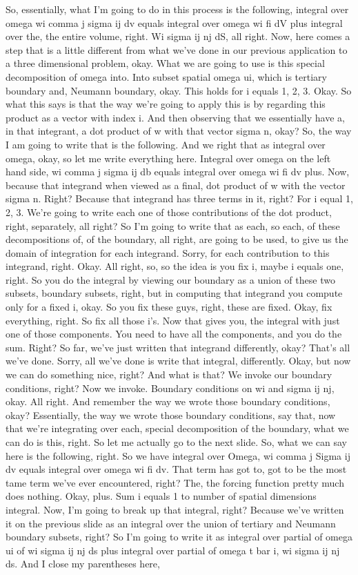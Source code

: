 \documentclass[10pt]{article}
\begin{document}
So, essentially, what I'm going to do in this process is the following, integral over omega wi comma j sigma ij dv equals integral over omega wi fi dV plus integral over the, the entire volume, right. Wi sigma ij nj dS, all right. Now, here comes a step that is a little different from what we've done in our previous application to a three dimensional problem, okay. What we are going to use is this special decomposition of omega into. Into subset spatial omega ui, which is tertiary boundary and, Neumann boundary, okay. This holds for i equals 1, 2, 3. Okay. So what this says is that the way we're going to apply this is by regarding this product as a vector with index i. And then observing that we essentially have a, in that integrant, a dot product of w with that vector sigma n, okay? So, the way I am going to write that is the following. And we right that as integral over omega, okay, so let me write everything here. Integral over omega on the left hand side, wi comma j sigma ij db equals integral over omega wi fi dv plus. Now, because that integrand when viewed as a final, dot product of w with the vector sigma n. Right? Because that integrand has three terms in it, right? For i equal 1, 2, 3. We're going to write each one of those contributions of the dot product, right, separately, all right? So I'm going to write that as each, so each, of these decompositions of, of the boundary, all right, are going to be used, to give us the domain of integration for each integrand. Sorry, for each contribution to this integrand, right. Okay. All right, so, so the idea is you fix i, maybe i equals one, right. So you do the integral by viewing our boundary as a union of these two subsets, boundary subsets, right, but in computing that integrand you compute only for a fixed i, okay. So you fix these guys, right, these are fixed. Okay, fix everything, right. So fix all those i's. Now that gives you, the integral with just one of those components. You need to have all the components, and you do the sum. Right? So far, we've just written that integrand differently, okay? That's all we've done. Sorry, all we've done is write that integral, differently. Okay, but now we can do something nice, right? And what is that? We invoke our boundary conditions, right? Now we invoke. Boundary conditions on wi and sigma ij nj, okay. All right. And remember the way we wrote those boundary conditions, okay? Essentially, the way we wrote those boundary conditions, say that, now that we're integrating over each, special decomposition of the boundary, what we can do is this, right. So let me actually go to the next slide. So, what we can say here is the following, right. So we have integral over Omega, wi comma j Sigma ij dv equals integral over omega wi fi dv. That term has got to, got to be the most tame term we've ever encountered, right? The, the forcing function pretty much does nothing. Okay, plus. Sum i equals 1 to number of spatial dimensions integral. Now, I'm going to break up that integral, right? Because we've written it on the previous slide as an integral over the union of tertiary and Neumann boundary subsets, right? So I'm going to write it as integral over partial of omega ui of wi sigma ij nj ds plus integral over partial of omega t bar i, wi sigma ij nj ds. And I close my parentheses here, 
\end{document}
